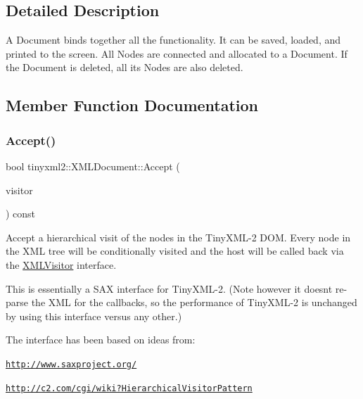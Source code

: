 \subsection{Detailed Description}
A Document binds together all the functionality. It can be saved, loaded, and printed to the screen. All Nodes are connected and allocated to a Document. If the Document is deleted, all its Nodes are also deleted. 

\subsection{Member Function Documentation}
\mbox{\label{classtinyxml2_1_1_x_m_l_document_ab7be651917a35ab1ff0e4e6d4e565cdf}} 
\subsubsection{\texorpdfstring{Accept()}{Accept()}}
{\footnotesize\ttfamily bool tinyxml2\+::\+X\+M\+L\+Document\+::\+Accept (\begin{DoxyParamCaption}\item[{\mbox{\hyperlink{classtinyxml2_1_1_x_m_l_visitor}{X\+M\+L\+Visitor}} $\ast$}]{visitor }\end{DoxyParamCaption}) const\hspace{0.3cm}{\ttfamily [virtual]}}

Accept a hierarchical visit of the nodes in the Tiny\+X\+M\+L-\/2 D\+OM. Every node in the X\+ML tree will be conditionally visited and the host will be called back via the \mbox{\hyperlink{classtinyxml2_1_1_x_m_l_visitor}{X\+M\+L\+Visitor}} interface.

This is essentially a S\+AX interface for Tiny\+X\+M\+L-\/2. (Note however it doesn\textquotesingle{}t re-\/parse the X\+ML for the callbacks, so the performance of Tiny\+X\+M\+L-\/2 is unchanged by using this interface versus any other.)

The interface has been based on ideas from\+:


\begin{DoxyItemize}
\item \href{http://www.saxproject.org/}{\tt http\+://www.\+saxproject.\+org/}
\item \href{http://c2.com/cgi/wiki?HierarchicalVisitorPattern}{\tt http\+://c2.\+com/cgi/wiki?\+Hierarchical\+Visitor\+Pattern}
\end{DoxyItemize}


